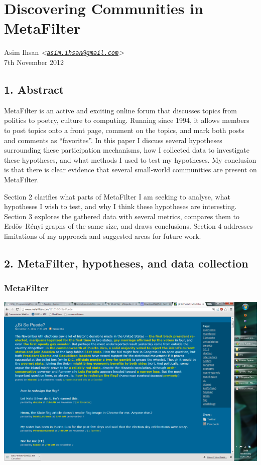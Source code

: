 \usepackage{fullpage}

\section{Discovering Communities in MetaFilter}

Asim Ihsan
\emph{\textless{}\href{mailto:asim.ihsan@gmail.com}{\texttt{asim.ihsan@gmail.com}}\textgreater{}}\\7th
November 2012

\subsection{1. Abstract}

MetaFilter is an active and exciting online forum that discusses topics
from politics to poetry, culture to computing. Running since 1994, it
allows members to post topics onto a front page, comment on the topics,
and mark both posts and comments as ``favorites''. In this paper I
discuss several hypotheses surrounding these participation mechanisms,
how I collected data to investigate these hypotheses, and what methods I
used to test my hypotheses. My conclusion is that there is clear
evidence that several small-world communities are present on MetaFilter.

Section 2 clarifies what parts of MetaFilter I am seeking to analyse,
what hypotheses I wish to test, and why I think these hypotheses are
interesting. Section 3 explores the gathered data with several metrics,
compares them to Erdős--Rényi graphs of the same size, and draws
conclusions. Section 4 addresses limitations of my approach and
suggested areas for future work.

\subsection{2. MetaFilter, hypotheses, and data collection}

\subsubsection{MetaFilter}

\includegraphics{01_metafilter_screenshot.png}~


